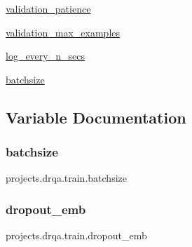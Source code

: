 \begin{DoxyCompactItemize}
\item 
\hyperlink{namespaceprojects_1_1drqa_1_1train_ab59023dba084ed0b45c9289632b06e60}{validation\+\_\+patience}
\item 
\hyperlink{namespaceprojects_1_1drqa_1_1train_a933201748734c2100575046a5f8d84ce}{validation\+\_\+max\+\_\+examples}
\item 
\hyperlink{namespaceprojects_1_1drqa_1_1train_a15898c0bd7f3aa8a0150ec46b6382254}{log\+\_\+every\+\_\+n\+\_\+secs}
\item 
\hyperlink{namespaceprojects_1_1drqa_1_1train_a5491a9ea692482469dcc37f207db1f9d}{batchsize}
\end{DoxyCompactItemize}


\subsection{Variable Documentation}
\mbox{\label{namespaceprojects_1_1drqa_1_1train_a5491a9ea692482469dcc37f207db1f9d}} 
\subsubsection{\texorpdfstring{batchsize}{batchsize}}
{\footnotesize\ttfamily projects.\+drqa.\+train.\+batchsize}

\mbox{\label{namespaceprojects_1_1drqa_1_1train_a9164658c897350ad4ed372ff1cef63e5}} 
\subsubsection{\texorpdfstring{dropout\+\_\+emb}{dropout\_emb}}
{\footnotesize\ttfamily projects.\+drqa.\+train.\+dropout\+\_\+emb}

\mbox{\label{namespaceprojects_1_1drqa_1_1train_a5c5d60fd6869c1359539252d24115883}} 
